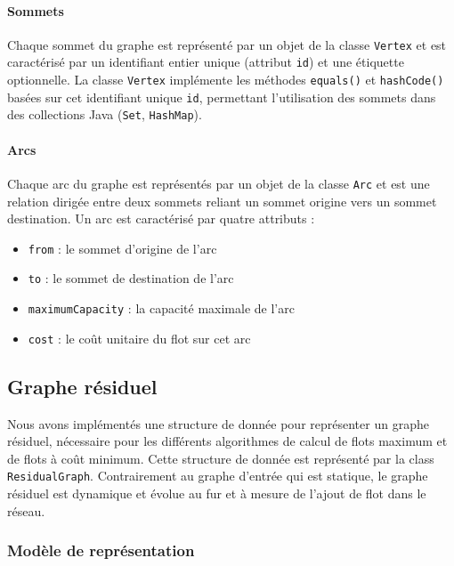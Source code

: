 \documentclass[titlepage]{article}
\begin{document}
\paragraph{Sommets} Chaque sommet du graphe est représenté par un objet de la classe \texttt{Vertex} et est caractérisé par un identifiant entier unique (attribut \texttt{id}) et une étiquette optionnelle. La classe \texttt{Vertex} implémente les méthodes \texttt{equals()} et \texttt{hashCode()} basées sur cet identifiant unique \texttt{id}, permettant l'utilisation des sommets dans des collections Java (\texttt{Set}, \texttt{HashMap}).

\paragraph{Arcs} Chaque arc du graphe est représentés par un objet de la classe \texttt{Arc} et est une relation dirigée entre deux sommets reliant un sommet origine vers un sommet destination. Un arc est caractérisé par quatre attributs :

\begin{itemize}
    \item \texttt{from} : le sommet d'origine de l'arc
    \item \texttt{to} : le sommet de destination de l'arc
    \item \texttt{maximumCapacity} : la capacité maximale de l'arc
    \item \texttt{cost} : le coût unitaire du flot sur cet arc
\end{itemize}

\clearpage


\subsection{Graphe résiduel}

Nous avons implémentés une structure de donnée pour représenter un graphe résiduel, nécessaire pour les différents algorithmes de calcul de flots maximum et de flots à coût minimum. Cette structure de donnée est représenté par la class \texttt{ResidualGraph}. Contrairement au graphe d'entrée qui est statique, le graphe résiduel est dynamique et évolue au fur et à mesure de l'ajout de flot dans le réseau.

\subsubsection{Modèle de représentation}
\end{document}
